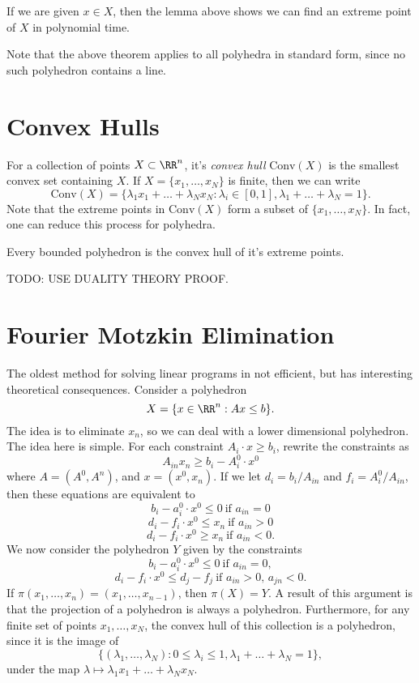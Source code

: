 \begin{remark}
    If we are given $x \in X$, then the lemma above shows we can find an extreme point of $X$ in polynomial time.
\end{remark}

Note that the above theorem applies to all polyhedra in standard form, since no such polyhedron contains a line.

\section{Convex Hulls}

For a collection of points $X \subset \RR^n$, it's \emph{convex hull} $\text{Conv}(X)$ is the smallest convex set containing $X$. If $X = \{ x_1, \dots, x_N \}$ is finite, then we can write
%
\[ \text{Conv}(X) = \{ \lambda_1 x_1 + \dots + \lambda_N x_N: \lambda_i \in [0,1], \lambda_1 + \dots + \lambda_N = 1 \}. \]
%
Note that the extreme points in $\text{Conv}(X)$ form a subset of $\{ x_1, \dots, x_N \}$. In fact, one can reduce this process for polyhedra.

\begin{lemma}
    Every bounded polyhedron is the convex hull of it's extreme points.
\end{lemma}

TODO: USE DUALITY THEORY PROOF.

\section{Fourier Motzkin Elimination}

The oldest method for solving linear programs in not efficient, but has interesting theoretical consequences. Consider a polyhedron
%
\[ X = \{ x \in \RR^n: Ax \leq b \}. \]
%
The idea is to eliminate $x_n$, so we can deal with a lower dimensional polyhedron. The idea here is simple. For each constraint $A_i \cdot x \geq b_i$, rewrite the constraints as
%
\[ A_{in} x_n \geq b_i - A_i^0 \cdot x^0 \]
%
where $A = (A^0,A^n)$, and $x = (x^0,x_n)$. If we let $d_i = b_i/A_{in}$ and $f_i = A_i^0/A_{in}$, then these equations are equivalent to
%
\[ b_i - a_i^0 \cdot x^0 \leq 0\ \text{if $a_{in} = 0$} \]
\[ d_i - f_i \cdot x^0 \leq x_n\ \text{if $a_{in} > 0$} \]
\[ d_i - f_i \cdot x^0 \geq x_n\ \text{if $a_{in} < 0$}. \]
%
We now consider the polyhedron $Y$ given by the constraints
%
\[ b_i - a_i^0 \cdot x^0 \leq 0\ \text{if $a_{in} = 0$}, \]
%
\[ d_i - f_i \cdot x^0 \leq d_j - f_j\ \text{if $a_{in} > 0$, $a_{jn} < 0$}. \]
%
If $\pi(x_1, \dots, x_n) = (x_1, \dots, x_{n-1})$, then $\pi(X) = Y$. A result of this argument is that the projection of a polyhedron is always a polyhedron. Furthermore, for any finite set of points $x_1, \dots, x_N$, the convex hull of this collection is a polyhedron, since it is the image of
%
\[ \{ (\lambda_1, \dots, \lambda_N) : 0 \leq \lambda_i \leq 1, \lambda_1 + \dots + \lambda_N = 1 \}, \]
%
under the map $\lambda \mapsto \lambda_1 x_1 + \dots + \lambda_N x_N$.

